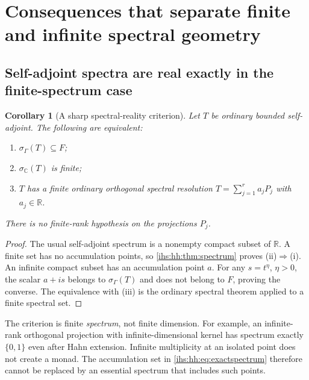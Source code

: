 \documentclass[11pt,a4paper]{article}
\numberwithin{equation}{section}
\newtheorem{corollary}[corollary]{Corollary}
\theoremstyle{definition}
\theoremstyle{remark}
\newcommand{\C}{\mathbb C}
\newcommand{\R}{\mathbb R}
\newcommand{\Fld}{F}
\begin{document}
\section{Consequences that separate finite and infinite spectral geometry}\label{ihs:hh:sec:consequences}

\subsection{Self-adjoint spectra are real exactly in the finite-spectrum case}\label{ihs:hh:sec:reality}
\begin{corollary}[A sharp spectral-reality criterion]\label{ihs:hh:cor:reality}
Let $T$ be ordinary bounded self-adjoint. The following are equivalent:
\begin{enumerate}[label=\textup{(\roman*)}]
\item $\sigma_\Gamma(T)\subseteq\Fld$;
\item $\sigma_\C(T)$ is finite;
\item $T$ has a finite ordinary orthogonal spectral resolution
$T=\sum_{j=1}^{r}a_jP_j$ with $a_j\in\R$.
\end{enumerate}
There is no finite-rank hypothesis on the projections $P_j$.
\end{corollary}
\begin{proof}
The usual self-adjoint spectrum is a nonempty compact subset of $\R$. A
finite set has no accumulation points, so \cref{ihs:hh:thm:spectrum} proves
(ii)$\Rightarrow$(i). An infinite compact subset has an accumulation point
$a$. For any $s=t^\eta$, $\eta>0$, the scalar $a+is$ belongs to
$\sigma_\Gamma(T)$ and does not belong to $\Fld$, proving the converse. The
equivalence with (iii) is the ordinary spectral theorem applied to a finite
spectral set.
\end{proof}

The criterion is finite \emph{spectrum}, not finite dimension. For example,
an infinite-rank orthogonal projection with infinite-dimensional kernel has
spectrum exactly $\{0,1\}$ even after Hahn extension. Infinite multiplicity
at an isolated point does not create a monad. The accumulation set in
\eqref{ihs:hh:eq:exactspectrum} therefore cannot be replaced by an essential
spectrum that includes such points.
\end{document}
